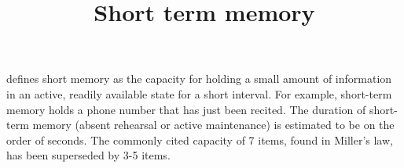 \documentclass[a4paper]{article}
\title{Short term memory}
\date{}
\begin{document}
    \maketitle
     defines short memory as the capacity for holding a small amount of information in an active, readily available state for a short interval. For example, short-term memory holds a phone number that has just been recited. The duration of short-term memory (absent rehearsal or active maintenance) is estimated to be on the order of seconds. The commonly cited capacity of 7 items, found in Miller's law, has been superseded by 3-5 items.
\end{document}
